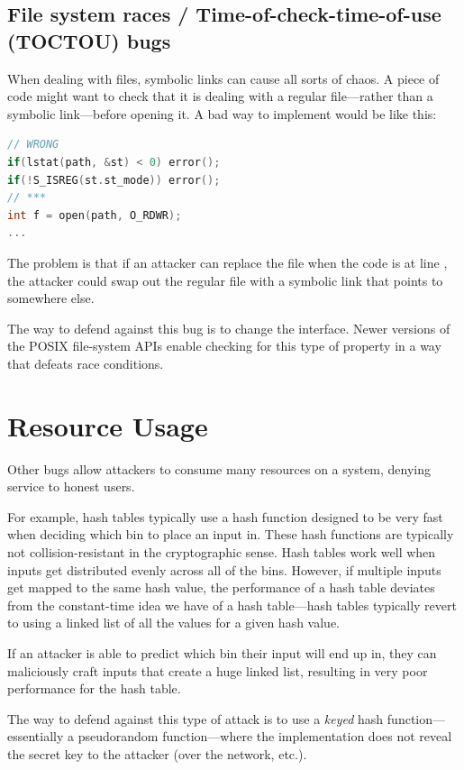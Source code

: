 \subsection{File system races / Time-of-check-time-of-use (TOCTOU) bugs}

When dealing with files, symbolic links can cause all sorts of chaos.
A piece of code might want to check that it is dealing with a regular
file---rather than a symbolic link---before opening it.
A bad way to implement would be like this:
\begin{lstlisting}[language=c]
// WRONG
if(lstat(path, &st) < 0) error();
if(!S_ISREG(st.st_mode)) error();
// ***
int f = open(path, O_RDWR);
...
\end{lstlisting}
The problem is that if an attacker can replace the file when
the code is at line \ttt{***}, the attacker could swap out
the regular file with a symbolic link that points to somewhere else.

The way to defend against this bug is to change the interface.
Newer versions of the POSIX file-system APIs enable checking
for this type of property in a way that defeats race conditions.


\section{Resource Usage}
Other bugs allow attackers to consume many resources on a system, denying service to honest users.

For example, 
hash tables typically use a hash function designed to be very fast when deciding which bin to place an input in. These hash functions are typically not collision-resistant in the cryptographic sense. Hash tables work well when inputs get distributed evenly across all of the bins. However, if multiple inputs get mapped to the same hash value, the performance of a hash table deviates from the constant-time idea we have of a hash table---hash tables typically revert to using a linked list of all the values for a given hash value.

If an attacker is able to predict which bin their input will end up in, they can maliciously craft inputs that create a huge linked list, resulting in very poor performance for the hash table.

The way to defend against this type of attack 
is to use a \emph{keyed} hash function---essentially a pseudorandom function---where
the implementation does not reveal the secret key to the attacker (over the network, etc.).

